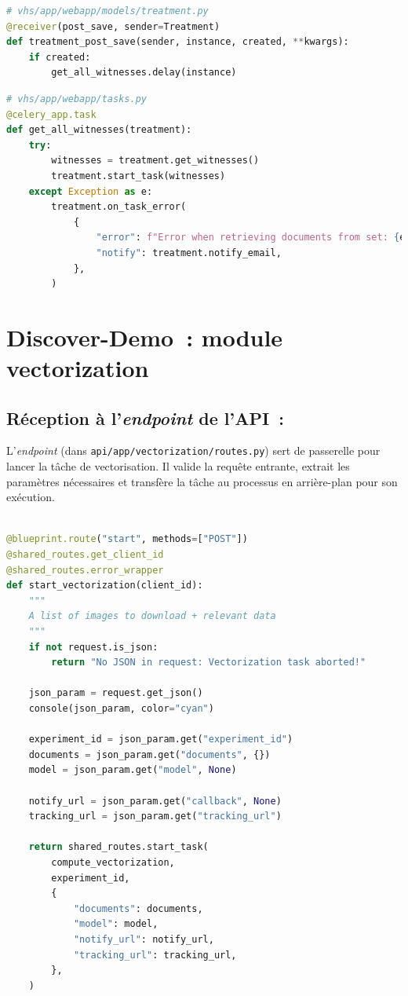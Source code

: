 \begin{lstlisting}[language=python, frame=single, breaklines=true, caption={Méthode \texttt{post\_save du \tr.}}]
# vhs/app/webapp/models/treatment.py
@receiver(post_save, sender=Treatment)
def treatment_post_save(sender, instance, created, **kwargs):
    if created:
        get_all_witnesses.delay(instance)
\end{lstlisting}


\begin{lstlisting}[language=python, frame=single, breaklines=true, caption={Ramener tous les \wits à partir des entités reliées aux \tr et lancer de la tâche.}]
# vhs/app/webapp/tasks.py
@celery_app.task
def get_all_witnesses(treatment):
    try:
        witnesses = treatment.get_witnesses()
        treatment.start_task(witnesses)
    except Exception as e:
        treatment.on_task_error(
            {
                "error": f"Error when retrieving documents from set: {e}",
                "notify": treatment.notify_email,
            },
        )
\end{lstlisting}

\section{Discover-Demo~: module vectorization}

\subsection{Réception à l'\emph{endpoint} de l'API~:}

L'\emph{endpoint} (dans \texttt{api/app/vectorization/routes.py}) sert de passerelle pour lancer la tâche de vectorisation. Il valide la requête entrante, extrait les paramètres nécessaires et transfère la tâche au processus en arrière-plan pour son exécution. 

 \begin{lstlisting}[language=python, frame=single, breaklines=true, caption={\emph{Endpoint} \texttt{start\_vectorization}.}]

@blueprint.route("start", methods=["POST"])
@shared_routes.get_client_id
@shared_routes.error_wrapper
def start_vectorization(client_id):
    """
    A list of images to download + relevant data
    """
    if not request.is_json:
        return "No JSON in request: Vectorization task aborted!"

    json_param = request.get_json()
    console(json_param, color="cyan")

    experiment_id = json_param.get("experiment_id")
    documents = json_param.get("documents", {})
    model = json_param.get("model", None)

    notify_url = json_param.get("callback", None)
    tracking_url = json_param.get("tracking_url")

    return shared_routes.start_task(
        compute_vectorization,
        experiment_id,
        {
            "documents": documents,
            "model": model,
            "notify_url": notify_url,
            "tracking_url": tracking_url,
        },
    )
 
	\end{lstlisting}


